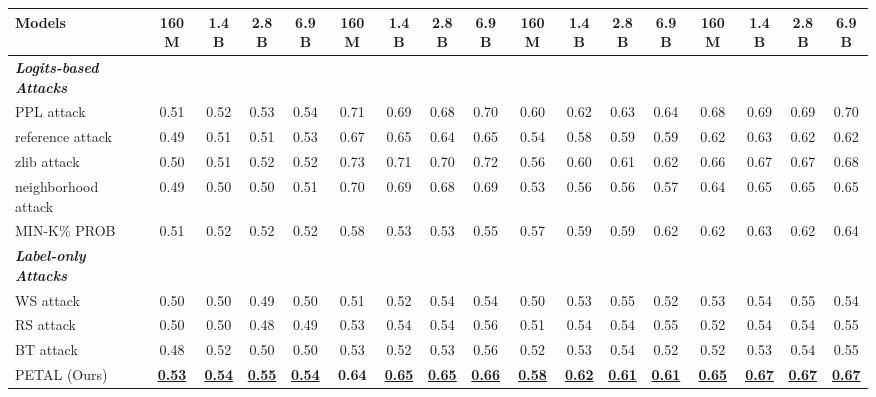 \begin{table*}[!t]
{\begin{tabular}{l|cccccccccccccccc}
\cmidrule(l{5pt}r{5pt}){2-5}\cmidrule(l{5pt}r{5pt}){6-9}\cmidrule(l{5pt}r{5pt}){10-13}\cmidrule(l{5pt}r{5pt}){14-17}
Models & 160M& 1.4B& 2.8B& 6.9B& 160M& 1.4B& 2.8B& 6.9B& 160M& 1.4B& 2.8B& 6.9B& 160M& 1.4B& 2.8B& 6.9B\\
\midrule
\textbf{\textit{Logits-based Attacks}}&&&&&&&&&&&&\\
PPL attack&0.51&0.52&0.53&0.54&0.71&0.69&0.68&0.70&0.60&0.62&0.63&0.64&0.68&0.69&0.69&0.70\\
reference attack&0.49&0.51&0.51&0.53&0.67&0.65&0.64&0.65&0.54&0.58&0.59&0.59&0.62&0.63&0.62&0.62\\
zlib attack&0.50&0.51&0.52&0.52&0.73&0.71&0.70&0.72&0.56&0.60&0.61&0.62&0.66&0.67&0.67&0.68\\
neighborhood attack&0.49&0.50&0.50&0.51&0.70&0.69&0.68&0.69&0.53&0.56&0.56&0.57&0.64&0.65&0.65&0.65\\
MIN-K\% PROB&0.51&0.52&0.52&0.52&0.58&0.53&0.53&0.55&0.57&0.59&0.59&0.62&0.62&0.63&0.62&0.64\\
\textbf{\textit{Label-only Attacks}}&&&&&&&&&&&&\\
WS attack&0.50&0.50&0.49&0.50&0.51&0.52&0.54&0.54&0.50&0.53&0.55&0.52&0.53&0.54&0.55&0.54\\
RS attack&0.50&0.50&0.48&0.49&0.53&0.54&0.54&0.56&0.51&0.54&0.54&0.55&0.52&0.54&0.54&0.55\\
BT attack&0.48&0.52&0.50&0.50&0.53&0.52&0.53&0.56&0.52&0.53&0.54&0.52&0.52&0.53&0.54&0.55\\
PETAL (Ours)&\ul{\textbf{0.53}}&\ul{\textbf{0.54}}&\ul{\textbf{0.55}}&\ul{\textbf{0.54}}&\textbf{0.64}&\ul{\textbf{0.65}}&\ul{\textbf{0.65}}&\ul{\textbf{0.66}}&\ul{\textbf{0.58}}&\ul{\textbf{0.62}}&\ul{\textbf{0.61}}&\ul{\textbf{0.61}}&\ul{\textbf{0.65}}&\ul{\textbf{0.67}}&\ul{\textbf{0.67}}&\ul{\textbf{0.67}}\\
\bottomrule
\end{tabular}
}
\vspace{-1.5em}
\label{table:main results auc on MIMIR}
\end{table*}